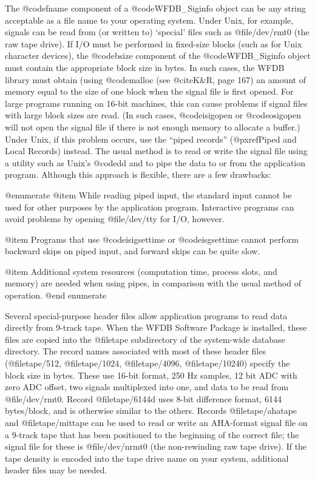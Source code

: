 {{{{{{{{{The @code{fname} component of a @code{WFDB_Siginfo} object can be any
string acceptable as a file name to your operating system.  Under Unix,
for example, signals can be read from (or written to) `special' files
such as @file{/dev/rmt0} (the raw tape drive).  If I/O must be performed
in fixed-size blocks (such as for Unix character devices), the
@code{bsize} component of the @code{WFDB_Siginfo} object must contain the
appropriate block size in bytes.  In such cases, the WFDB library must
obtain (using @code{malloc} (see @cite{K&R}, page 167) an amount of
memory equal to the size of one block when the signal file is first
opened.  For large programs running on 16-bit machines, this can cause
problems if signal files with large block sizes are read.  (In such
cases, @code{isigopen} or @code{osigopen} will not open the signal file
if there is not enough memory to allocate a buffer.)  Under Unix, if
this problem occurs, use the ``piped records'' (@pxref{Piped and Local
Records}) instead.  The usual method is to read or write the signal file
using a utility such as Unix's @code{dd} and to pipe the data to or from
the application program.  Although this approach is flexible, there are
a few drawbacks:

@enumerate
@item
While reading piped input, the standard input cannot be used for other
purposes by the application program.  Interactive programs can avoid
problems by opening @file{/dev/tty} for I/O, however.

@item
Programs that use @code{isigsettime} or @code{isgsettime} cannot perform
backward skips on piped input, and forward skips can be quite slow.

@item
Additional system resources (computation time, process slots, and
memory) are needed when using pipes, in comparison with the usual
method of operation.
@end enumerate

Several special-purpose header files allow application programs to read data
directly from 9-track tape.  When the WFDB Software Package is installed, these
files are copied into the @file{tape} subdirectory of the system-wide database
directory.  The record names associated with most of these header files
(@file{tape/512}, @file{tape/1024}, @file{tape/4096}, @file{tape/10240})
specify the block size in bytes.  These use 16-bit format, 250 Hz samples, 12
bit ADC with zero ADC offset, two signals multiplexed into one, and data to be
read from @file{/dev/rmt0}.  Record @file{tape/6144d} uses 8-bit difference
format, 6144 bytes/block, and is otherwise similar to the others.  Records
@file{tape/ahatape} and @file{tape/mittape} can be used to read or write an
AHA-format signal file on a 9-track tape that has been positioned to the
beginning of the correct file; the signal file for these is @file{/dev/nrmt0}
(the non-rewinding raw tape drive).  If the tape density is encoded into the
tape drive name on your system, additional header files may be needed.

}}}}}}}}}

